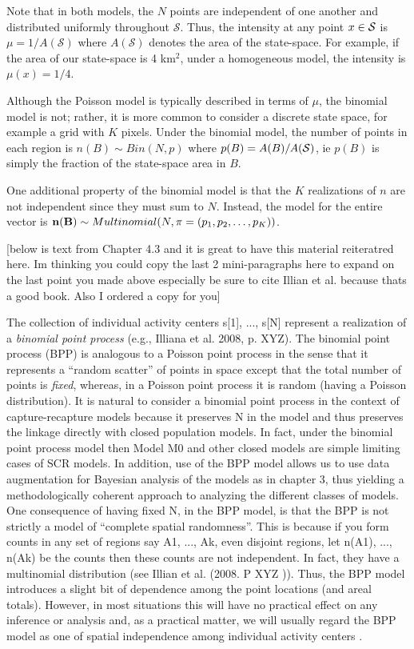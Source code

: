 Note that in both models, the $N$ points are independent
of one another and distributed uniformly
throughout $\mathcal{S}$. Thus, the intensity at any point $x \in
\cal{S}$ is $\mu = 1 / A(\mathcal{S})$ where $A(\mathcal{S})$ denotes
the area of the state-space. For example, if the area of our
state-space is 4 km$^2$,
under a homogeneous model, the intensity is $\mu(x) = 1/4$.

Although the Poisson model is typically described in terms of $\mu$,
the binomial model is not; rather, it
is more common to consider a discrete state space, for example a grid
with $K$ pixels. Under the binomial model, the number of points in
each region is $n(B) \sim Bin(N, p)$
where $p(B) = A(B)/A(\cal{S})$, ie $p(B)$ is simply the fraction of
the state-space area in $B$.

One additional property of the binomial model is that the $K$
realizations of $n$ are not independent since they must sum to
$N$. Instead, the model for the entire vector
is ${\bf n(B)} \sim Multinomial(N, {\mathbf{\pi}} = (p_1, p_2, \dots, p_K))$.



[below is text from Chapter 4.3 and it is great to have this
material reiteratred here.  Im thinking you could copy the last 2
mini-paragraphs here to expand on the last point you made above
especially be sure to cite Illian et al. because thats a good
book. Also I ordered a copy for you]

The collection of individual activity centers s[1], ..., s[N] represent
a realization of a {\it binomial point process} (e.g., Illiana et
al. 2008, p. XYZ).  The binomial point process (BPP) is analogous to a
Poisson point process in the sense that it represents a ``random
scatter'' of points in space except that the total number of points
is {\it fixed}, whereas, in a Poisson point process it is random
(having a Poisson distribution).   It is natural to consider a
binomial point process in the context of capture-recapture models
because it preserves N in the model and thus preserves the linkage
directly with closed population models. In fact, under the binomial
point process model then Model M0 and other closed models are simple
limiting cases of SCR models. In addition, use of the BPP model allows
us to use data augmentation for Bayesian analysis of the models as in
chapter 3, thus yielding a methodologically coherent approach to
analyzing the different classes of models.
One consequence of having fixed N, in the BPP model, is that the BPP
is not strictly a model of ``complete spatial randomness''. This is
because if you form counts in any set of regions say A1, ..., Ak, even
disjoint regions, let n(A1), ..., n(Ak) be the counts then these counts
are not independent. In fact, they have a multinomial distribution
(see Illian et al. (2008. P XYZ )).
 Thus, the BPP model introduces a slight bit of dependence among the
 point locations (and areal totals). However, in most situations this
 will have no practical effect on any inference or analysis and, as a
 practical matter, we will usually regard the BPP model as one of
 spatial independence among individual activity centers .

